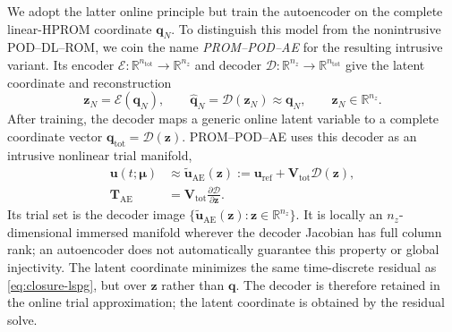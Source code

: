 \documentclass[11pt]{article}
\newcommand{\q}{\mathbf q}
\newcommand{\qtot}{\mathbf q_{\mathrm{tot}}}
\newcommand{\qp}{\q}
\newcommand{\uvec}{\mathbf u}
\newcommand{\utilde}{\widetilde{\mathbf u}}
\newcommand{\mub}{\bm\mu}
\newcommand{\z}{\mathbf z}
\begin{document}
We adopt the latter online principle but train the autoencoder on the
complete linear-HPROM coordinate $\q_N$.  To distinguish this model from
the nonintrusive POD--DL--ROM, we coin the name \emph{PROM--POD--AE} for
the resulting intrusive variant.  Its encoder
$\mathcal E:\mathbb R^{n_{\mathrm{tot}}}\to\mathbb R^{n_z}$ and decoder
$\mathcal D:\mathbb R^{n_z}\to\mathbb R^{n_{\mathrm{tot}}}$ give the
latent coordinate and reconstruction
\begin{equation}
\z_N=\mathcal E(\q_N),\qquad
\widehat{\q}_N=\mathcal D(\z_N)\approx\q_N,\qquad
\z_N\in\mathbb R^{n_z}.
\label{eq:podae-reference-training}
\end{equation}
After training, the decoder maps a generic online latent variable to a
complete coordinate vector $\qtot=\mathcal D(\z)$.  PROM--POD--AE uses this
decoder as an intrusive nonlinear trial manifold,
\begin{equation}
\begin{aligned}
\uvec(t;\mub)&\approx
\utilde_{\mathrm{AE}}(\z)
:=\uvec_{\mathrm{ref}}+\mathbf V_{\mathrm{tot}}\mathcal D(\z),\\
\mathbf T_{\mathrm{AE}}&=\mathbf V_{\mathrm{tot}}
\frac{\partial\mathcal D}{\partial\z}.
\end{aligned}
\label{eq:podae-manifold}
\end{equation}
Its trial set is the decoder image
$\{\utilde_{\mathrm{AE}}(\z):\z\in\mathbb R^{n_z}\}$.
It is locally an $n_z$-dimensional immersed manifold wherever the decoder
Jacobian has full column rank; an autoencoder does not automatically
guarantee this property or global injectivity.
The latent coordinate minimizes the same time-discrete residual as
\eqref{eq:closure-lspg}, but over $\z$ rather than $\qp$.
The decoder is therefore retained in the online trial approximation;
the latent coordinate is obtained by the residual solve.
\end{document}
